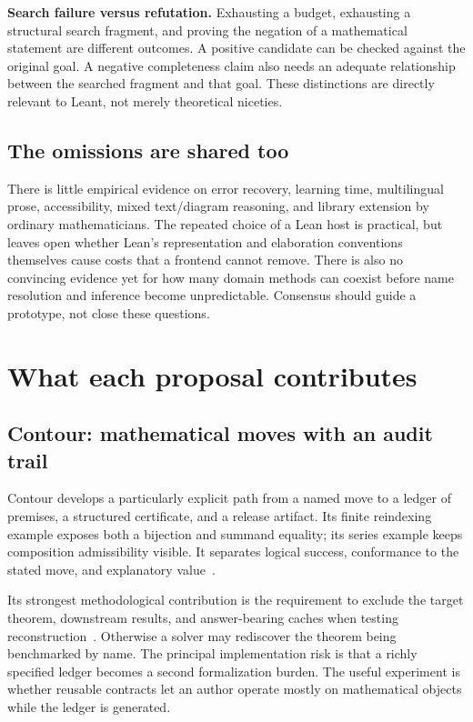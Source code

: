 \documentclass[11pt,letterpaper]{article}
\begin{document}
\textbf{Search failure versus refutation.} Exhausting a budget, exhausting a
structural search fragment, and proving the negation of a mathematical statement
are different outcomes. A positive candidate can be checked against the original
goal. A negative completeness claim also needs an adequate relationship between
the searched fragment and that goal. These distinctions are directly relevant to
Leant, not merely theoretical niceties.

\subsection{The omissions are shared too}
There is little empirical evidence on error recovery, learning time, multilingual
prose, accessibility, mixed text/diagram reasoning, and library extension by ordinary
mathematicians. The repeated choice of a Lean host is practical, but leaves open
whether Lean's representation and elaboration conventions themselves cause costs
that a frontend cannot remove. There is also no convincing evidence yet for how
many domain methods can coexist before name resolution and inference become
unpredictable. Consensus should guide a prototype, not close these questions.

\section{What each proposal contributes}\label{sec:profiles}
\subsection{Contour: mathematical moves with an audit trail}
Contour develops a particularly explicit path from a named move to a ledger of
premises, a structured certificate, and a release artifact. Its finite reindexing
example exposes both a bijection and summand equality; its series example keeps
composition admissibility visible. It separates logical success, conformance to
the stated move, and explanatory value~\cite[\S\S6,7,11,12]{contour}.

Its strongest methodological contribution is the requirement to exclude the target
theorem, downstream results, and answer-bearing caches when testing reconstruction~\cite[\S15.2]{contour}.
Otherwise a solver may rediscover the theorem being benchmarked by name. The
principal implementation risk is that a richly specified ledger becomes a second
formalization burden. The useful experiment is whether reusable contracts let an
author operate mostly on mathematical objects while the ledger is generated.
\end{document}
